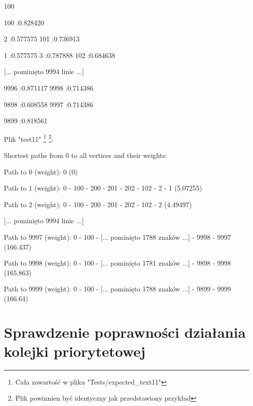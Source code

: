 \documentclass[11pt,a4paper]{report}
\newenvironment{multiconsole}{\begingroup\fontfamily{qcr}\selectfont}{\endgroup}
\begin{document}
    \begin{multiconsole}
        100 100

        \hspace{2em}100 :0.828420

        \hspace{2em}2 :0.577575  101 :0.736913 

        \hspace{2em}1 :0.577575  3 :0.787888  102 :0.684638 

        [... pominięto 9994 linie ...]

        \hspace{2em}9996 :0.871117  9998 :0.714386

        \hspace{2em}9898 :0.608558  9997 :0.714386 

        \hspace{2em}9899 :0.818561 

    \end{multiconsole}

    \vspace{1em}

    Plik "test11" \footnote{Cała zawartość w pliku "Tests/expected\_text11"} \footnote{Plik powinnien być identyczny jak przedstawiony przykład}:

    \begin{multiconsole}
        Shortest paths from 0 to all vertices and their weights:

        

        Path to 0 (weight): 0 (0) 

        Path to 1 (weight): 0 - 100 - 200 - 201 - 202 - 102 - 2 - 1 (5.07255)

        Path to 2 (weight): 0 - 100 - 200 - 201 - 202 - 102 - 2 (4.49497)

        [... pominięto 9994 linie ...]

        Path to 9997 (weight): 0 - 100 - [... pominięto 1788 znaków ...] - 9998 - 9997 (166.437)

        Path to 9998 (weight): 0 - 100 - [... pominięto 1781 znaków ...] - 9898 - 9998 (165.863)

        Path to 9999 (weight): 0 - 100 - [... pominięto 1788 znaków ...] - 9899 - 9999 (166.64)
    \end{multiconsole}


    \newpage
    \section{Sprawdzenie poprawności działania kolejki priorytetowej}
\end{document}
